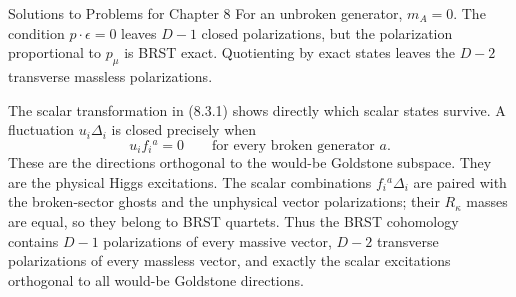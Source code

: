 \begin{bankssolutions}{Solutions to Problems for Chapter 8}
For an unbroken generator, $m_A=0$.  The condition $p\cdot\epsilon=0$ leaves
$D-1$ closed polarizations, but the polarization proportional to $p_\mu$ is
BRST exact.  Quotienting by exact states leaves the $D-2$ transverse massless
polarizations.

The scalar transformation in (8.3.1) shows directly which scalar states
survive.  A fluctuation $u_i\Delta_i$ is closed precisely when
\[
  u_if_i{}^a=0\qquad\text{for every broken generator }a .
\]
These are the directions orthogonal to the would-be Goldstone subspace.  They
are the physical Higgs excitations.  The scalar combinations $f_i{}^a\Delta_i$
are paired with the broken-sector ghosts and the unphysical vector
polarizations; their $R_\kappa$ masses are equal, so they belong to BRST
quartets.  Thus the BRST cohomology contains $D-1$ polarizations of every
massive vector, $D-2$ transverse polarizations of every massless vector, and
exactly the scalar excitations orthogonal to all would-be Goldstone directions.


\end{bankssolutions}
